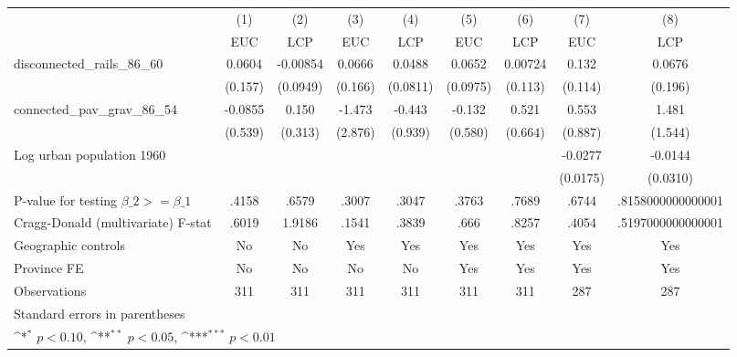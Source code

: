 {
\def\sym#1{\ifmmode^{#1}\else\(^{#1}\)\fi}
\begin{tabular}{l*{8}{c}}
\hline\hline
                &\multicolumn{1}{c}{(1)}&\multicolumn{1}{c}{(2)}&\multicolumn{1}{c}{(3)}&\multicolumn{1}{c}{(4)}&\multicolumn{1}{c}{(5)}&\multicolumn{1}{c}{(6)}&\multicolumn{1}{c}{(7)}&\multicolumn{1}{c}{(8)}\\
                &\multicolumn{1}{c}{EUC}&\multicolumn{1}{c}{LCP}&\multicolumn{1}{c}{EUC}&\multicolumn{1}{c}{LCP}&\multicolumn{1}{c}{EUC}&\multicolumn{1}{c}{LCP}&\multicolumn{1}{c}{EUC}&\multicolumn{1}{c}{LCP}\\
\hline
disconnected\_rails\_86\_60&   0.0604         & -0.00854         &   0.0666         &   0.0488         &   0.0652         &  0.00724         &    0.132         &   0.0676         \\
                &  (0.157)         & (0.0949)         &  (0.166)         & (0.0811)         & (0.0975)         &  (0.113)         &  (0.114)         &  (0.196)         \\
[1em]
connected\_pav\_grav\_86\_54&  -0.0855         &    0.150         &   -1.473         &   -0.443         &   -0.132         &    0.521         &    0.553         &    1.481         \\
                &  (0.539)         &  (0.313)         &  (2.876)         &  (0.939)         &  (0.580)         &  (0.664)         &  (0.887)         &  (1.544)         \\
[1em]
Log urban population 1960&                  &                  &                  &                  &                  &                  &  -0.0277         &  -0.0144         \\
                &                  &                  &                  &                  &                  &                  & (0.0175)         & (0.0310)         \\
\hline
P-value for testing $\beta\_{2} >= \beta\_{1}$&    .4158         &    .6579         &    .3007         &    .3047         &    .3763         &    .7689         &    .6744         &.8158000000000001         \\
Cragg-Donald (multivariate) F-stat&    .6019         &   1.9186         &    .1541         &    .3839         &     .666         &    .8257         &    .4054         &.5197000000000001         \\
Geographic controls&       No         &       No         &      Yes         &      Yes         &      Yes         &      Yes         &      Yes         &      Yes         \\
Province FE     &       No         &       No         &       No         &       No         &      Yes         &      Yes         &      Yes         &      Yes         \\
Observations    &      311         &      311         &      311         &      311         &      311         &      311         &      287         &      287         \\
\hline\hline
\multicolumn{9}{l}{\footnotesize Standard errors in parentheses}\\
\multicolumn{9}{l}{\footnotesize \sym{*} \(p<0.10\), \sym{**} \(p<0.05\), \sym{***} \(p<0.01\)}\\
\end{tabular}
}
